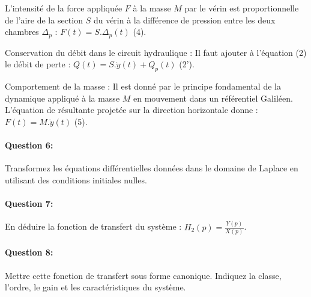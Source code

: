 L'intensité de la force appliquée $F$ à la masse $M$ par le vérin est proportionnelle de l'aire de la section $S$ du vérin à la différence de pression entre les deux chambres $\Delta_p$ : $F(t)=S.\Delta_p(t)$ (4).

Conservation du débit dans le circuit hydraulique : Il faut ajouter à l'équation (2) le débit de perte : $Q(t)=S.\dot{y}(t)+Q_p(t)$ (2').

Comportement de la masse : Il est donné par le principe fondamental de la dynamique appliqué à la masse $M$ en
mouvement dans un référentiel Galiléen. L'équation de résultante projetée sur la direction horizontale donne :
$F(t)=M.\ddot{y}(t)$ (5).

\paragraph{Question 6:} Transformez les équations différentielles données dans le domaine de Laplace en utilisant
des conditions initiales nulles.

\paragraph{Question 7:} En déduire la fonction de transfert du système : $H_2(p)=\frac{Y(p)}{X(p)}$.

\paragraph{Question 8:} Mettre cette fonction de transfert sous forme canonique. Indiquez la classe, l'ordre, le
gain et les caractéristiques du système.

